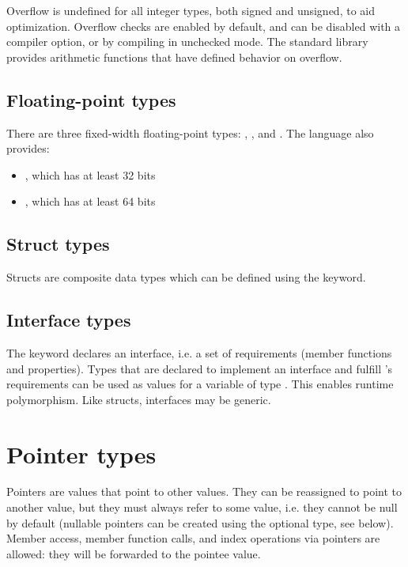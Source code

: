 Overflow is undefined for all integer types, both signed and unsigned, to aid
optimization. Overflow checks are enabled by default, and can be disabled with a
compiler option, or by compiling in unchecked mode. The standard library
provides arithmetic functions that have defined behavior on overflow.

\subsection{Floating-point types}

There are three fixed-width floating-point types: ,
, and . The language also provides:

\begin{itemize}
\item {}, which has at least 32 bits
\item {}, which has at least 64 bits
\end{itemize}

\subsection{Struct types}

Structs are composite data types which can be defined using the 
keyword.

\subsection{Interface types}

The  keyword declares an interface, i.e. a set of requirements
(member functions and properties). Types that are declared to implement an
interface  and fulfill 's requirements can be used as values for
a variable of type . This enables runtime polymorphism. Like structs,
interfaces may be generic.

\section{Pointer types}

Pointers are values that point to other values. They can be reassigned to point
to another value, but they must always refer to some value, i.e. they cannot be
null by default (nullable pointers can be created using the optional type, see
below). Member access, member function calls, and index operations via
pointers are allowed: they will be forwarded to the pointee value.

